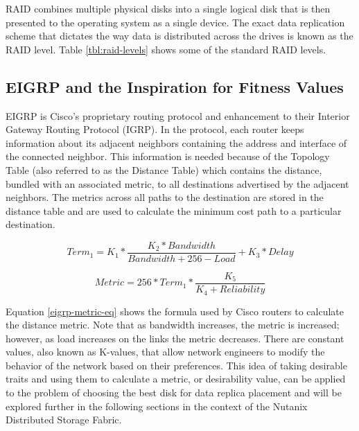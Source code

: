 \documentclass[12pt]{article}
\begin{document}
  RAID combines multiple physical disks into a single logical disk that is then
  presented to the operating system as a single device. The exact data
  replication scheme that dictates the way data is distributed across the
  drives is known as the RAID level. Table \ref{tbl:raid-levels} shows some of
  the standard RAID levels.

  \subsection{EIGRP and the Inspiration for Fitness Values}
  \label{eigrp-motivation}

  EIGRP \cite{eigrp} is Cisco's proprietary routing protocol and enhancement to
  their Interior Gateway Routing Protocol (IGRP). In the protocol, each router
  keeps information about its adjacent neighbors containing the address and
  interface of the connected neighbor. This information is needed because of
  the Topology Table (also referred to as the Distance Table) which contains
  the distance, bundled with an associated metric, to all destinations
  advertised by the adjacent neighbors. The metrics across all paths to the
  destination are stored in the distance table and are used to calculate the
  minimum cost path to a particular destination.

  \begin{equation}
    Term_{1} = K_{1} * \frac{K_{2} * Bandwidth}{Bandwidth + 256 - Load} + K_{3} * Delay
  \end{equation}

  \begin{equation} \label{eigrp-metric-eq}
    Metric = 256 * Term_{1} * \frac{K_{5}}{K_{4} + Reliability}
  \end{equation}

  Equation \ref{eigrp-metric-eq} shows the formula used by Cisco routers to
  calculate the distance metric. Note that as bandwidth increases, the metric
  is increased; however, as load increases on the links the metric decreases.
  There are constant values, also known as K-values, that allow network
  engineers to modify the behavior of the network based on their preferences.
  This idea of taking desirable traits and using them to calculate a metric, or
  desirability value, can be applied to the problem of choosing the best disk
  for data replica placement and will be explored further in the following
  sections in the context of the Nutanix Distributed Storage Fabric.

\end{document}
